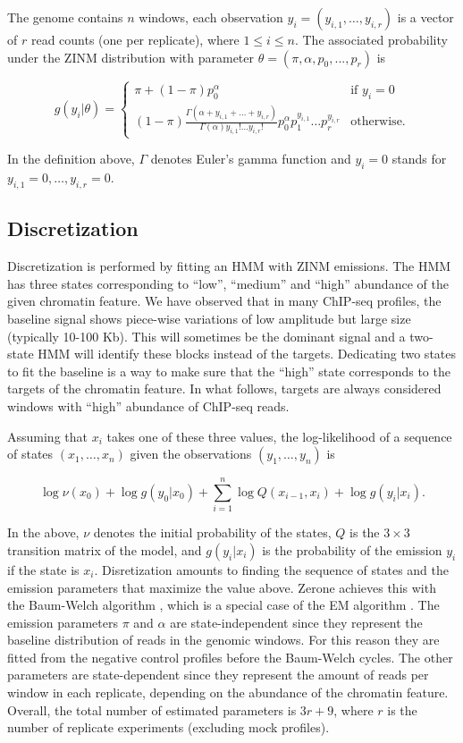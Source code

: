 \documentclass{bioinfo}
\begin{document}
\begin{methods}
The genome contains $n$ windows, each observation
$y_i = (y_{i,1}, \ldots, y_{i,r})$ is a vector of $r$ read counts
(one per replicate), where $1 \leq i \leq n$. The associated probability
under the ZINM distribution with parameter
$\theta = (\pi, \alpha, p_0, ..., p_r)$ is

$$
g(y_i|\theta) = \left\{
\begin{array}{ll}
\pi + (1-\pi)p_0^{\alpha}
         & \mbox{if } y_i = 0 \\
(1-\pi )\frac{\Gamma(\alpha + y_{i,1} + \ldots + y_{i,r})}
  {\Gamma(\alpha)y_{i,1}! \ldots y_{i,r}!}
p_0^{\alpha} p_1^{y_{i,1}} \ldots p_r^{y_{i,r}}
         & \mbox{otherwise.}
\end{array}
\right.
$$

In the definition above, $\Gamma$ denotes Euler's gamma function and
$y_i = 0$ stands for $y_{i,1} = 0, \ldots, y_{i,r} = 0$.

\subsection{Discretization}
Discretization is performed by fitting an HMM
with ZINM emissions. The HMM has three
states corresponding to ``low'', ``medium'' and ``high'' abundance of
the given chromatin feature. We have observed that in many ChIP-seq
profiles, the baseline signal shows piece-wise variations of low amplitude
but large size (typically 10-100 Kb). This will sometimes be the dominant
signal and a two-state HMM will identify these blocks instead of the
targets. Dedicating two states to fit the baseline is a way to make sure
that the ``high'' state corresponds to the targets of the chromatin
feature. In what follows, targets are always considered windows
with ``high'' abundance of ChIP-seq reads.

Assuming that $x_i$ takes one of these three values, the log-likelihood of
a sequence of states $(x_1, \ldots, x_n)$ given the observations
$(y_1, \ldots, y_n)$ is

$$
\log \nu(x_0) + \log g(y_0|x_0) +
   \sum_{i=1}^n \log Q(x_{i-1},x_i) + \log g(y_i|x_i).
$$

In the above, $\nu$ denotes the initial probability of the states,
$Q$ is the $3 \times 3$ transition matrix of the model, and
$g(y_i|x_i)$ is the probability of the emission $y_i$ if the state is
$x_i$. Disretization amounts to finding the sequence of states and the
emission parameters that maximize the value above. Zerone achieves this
with the Baum-Welch algorithm \citep{baum1966}, which is a special case
of the EM algorithm \citep{Dempster77maximumlikelihood}. The emission
parameters $\pi$ and $\alpha$ are state-independent since they represent
the baseline distribution of reads in the genomic windows. For this
reason they are fitted from the negative control profiles before the
Baum-Welch cycles. The other parameters are state-dependent since they
represent the amount of reads per window in each replicate, depending
on the abundance of the chromatin feature. Overall, the
total number of estimated parameters is $3r+9$, where $r$ is the
number of replicate experiments (excluding mock profiles).


\end{methods}
\end{document}
